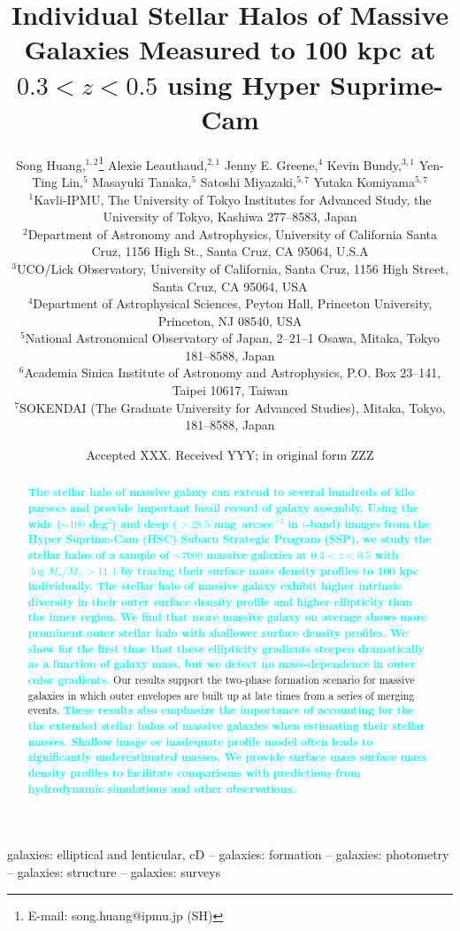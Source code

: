 \documentclass[a4paper,fleqn,usenatbib]{mnras}
\title[Mass Dependent Stellar Halos in Massive Galaxies]{Individual Stellar Halos of 
	   Massive Galaxies Measured to 100 kpc at $0.3<z<0.5$ using Hyper Suprime-Cam}
\author[S. Huang et al.]{
        Song Huang,$^{1,2}$\thanks{E-mail: song.huang@ipmu.jp (SH)}
        Alexie Leauthaud,$^{2,1}$
        Jenny E. Greene,$^{4}$
        Kevin Bundy,$^{3,1}$
        \newauthor
        Yen-Ting Lin,$^{5}$
        Masayuki Tanaka,$^{5}$
        Satoshi Miyazaki,$^{5,7}$
        \newauthor
        Yutaka Komiyama$^{5,7}$
        \\
        $^{1}$Kavli-IPMU, The University of Tokyo Institutes for Advanced Study, 
              the University of Tokyo, Kashiwa 277--8583, Japan\\
        $^{2}$Department of Astronomy and Astrophysics, University of California 
              Santa Cruz, 1156 High St., Santa Cruz, CA 95064, U.S.A\\
        $^{3}$UCO/Lick Observatory, University of California, Santa Cruz,
              1156 High Street, Santa Cruz, CA 95064, USA\\
        $^{4}$Department of Astrophysical Sciences, Peyton Hall,
              Princeton University, Princeton, NJ 08540, USA \\
        $^{5}$National Astronomical Observatory of Japan, 2--21--1 Osawa, Mitaka, 
              Tokyo 181--8588, Japan\\
        $^{6}$Academia Sinica Institute of Astronomy and Astrophysics, 
              P.O. Box 23--141, Taipei 10617, Taiwan\\
        $^{7}$SOKENDAI (The Graduate University for Advanced Studies), Mitaka,
              Tokyo, 181--8588, Japan
        }
\date{Accepted XXX. Received YYY; in original form ZZZ}
\def\sb{mag~arcsec$^{-2}$}
\newcommand{\song}[1]{\textcolor{cyan}{\textbf{#1}}}
\begin{document}
\label{firstpage}
\pagerange{\pageref{firstpage}--\pageref{lastpage}}

\maketitle


\begin{abstract} 
    
    \song{
    The stellar halo of massive galaxy can extend to several hundreds of kilo 
    parsecs and provide important fossil record of galaxy assembly.
    Using the wide (${\sim}100$ deg$^2$) and deep ($>28.5$ \sb{} in $i$-band) images 
    from the Hyper Suprime-Cam (HSC) Subaru Strategic Program (SSP), we study 
    the stellar halos of a sample of $\sim7000$ massive galaxies at 
    $0.3 < z < 0.5$ with $\log M_{\star}/M_{\odot} > 11.4$ by tracing their  
    surface mass density profiles to 100 kpc individually. 
    The stellar halo of massive galaxy exhibit higher intrinsic diversity in their 
    outer surface density profile and higher ellipticity than the inner region. 
    We find that more massive galaxy on average shows more prominent outer stellar 
    halo with shallower surface density profiles.
    We show for the first time that these ellipticity gradients steepen dramatically as 
    a function of galaxy mass, but we detect no mass-dependence in outer color gradients.
    }
    Our results support the two-phase formation scenario for massive galaxies in which 
    outer envelopes are built up at late times from a series of merging events.
    \song{
    These results also emphasize the importance of accounting for the the extended 
    stellar halos of massive galaxies when estimating their stellar masses. 
    Shallow image or inadequate profile model often leads to significantly 
    underestimated masses.
    We provide surface mass surface mass density profiles to facilitate comparisons 
    with predictions from hydrodynamic simulations and other observations.
    }
    
\end{abstract}

\begin{keywords}
    galaxies: elliptical and lenticular, cD --
    galaxies: formation --
    galaxies: photometry -- 
    galaxies: structure -- 
    galaxies: surveys
\end{keywords}

\end{document}
